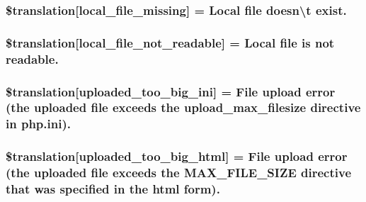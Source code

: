 \subsubsection[{\$translation}]{\setlength{\rightskip}{0pt plus 5cm}\$translation\mbox{[}\textquotesingle{}local\+\_\+file\+\_\+missing\textquotesingle{}\mbox{]} = \textquotesingle{}Local file doesn\textbackslash{}\textquotesingle{}t exist.\textquotesingle{}}\label{class_8upload_8xx___x_x_8php_a6ec3d3a47ab70d77e7aa593e82ead10e}
\hypertarget{class_8upload_8xx___x_x_8php_a60104befef9b241f3a7a6a755618a4b3}{}
\subsubsection[{\$translation}]{\setlength{\rightskip}{0pt plus 5cm}\$translation\mbox{[}\textquotesingle{}local\+\_\+file\+\_\+not\+\_\+readable\textquotesingle{}\mbox{]} = \textquotesingle{}Local file is not readable.\textquotesingle{}}\label{class_8upload_8xx___x_x_8php_a60104befef9b241f3a7a6a755618a4b3}
\hypertarget{class_8upload_8xx___x_x_8php_a6a08dcd0d3651fdd098568f6b2f0a42c}{}
\subsubsection[{\$translation}]{\setlength{\rightskip}{0pt plus 5cm}\$translation\mbox{[}\textquotesingle{}uploaded\+\_\+too\+\_\+big\+\_\+ini\textquotesingle{}\mbox{]} = \textquotesingle{}File {\bf upload} error (the uploaded file exceeds the upload\+\_\+max\+\_\+filesize directive in php.\+ini).\textquotesingle{}}\label{class_8upload_8xx___x_x_8php_a6a08dcd0d3651fdd098568f6b2f0a42c}
\hypertarget{class_8upload_8xx___x_x_8php_a623d5b8b92169f57d7e43458aa911cbb}{}
\subsubsection[{\$translation}]{\setlength{\rightskip}{0pt plus 5cm}\$translation\mbox{[}\textquotesingle{}uploaded\+\_\+too\+\_\+big\+\_\+html\textquotesingle{}\mbox{]} = \textquotesingle{}File {\bf upload} error (the uploaded file exceeds the M\+A\+X\+\_\+\+F\+I\+L\+E\+\_\+\+S\+I\+Z\+E directive that was specified in the html form).\textquotesingle{}}\label{class_8upload_8xx___x_x_8php_a623d5b8b92169f57d7e43458aa911cbb}
\hypertarget{class_8upload_8xx___x_x_8php_a967c17da21b0a2d3bd65cca3a9ca0ea8}{}
